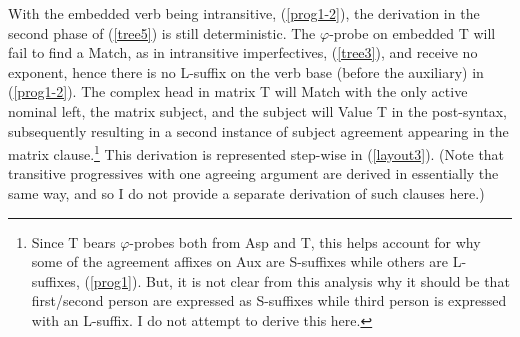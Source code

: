 \documentclass[output=paper
,modfonts
,nonflat]{langsci/langscibook}
\begin{document}
\begin{exe}
\ex\label{tree5}%
\end{exe}

With the embedded verb being intransitive, (\ref{prog1-2}), the derivation in the second phase of (\ref{tree5}) is still deterministic. The $\varphi$-probe on embedded T will fail to find a Match, as in intransitive imperfectives, (\ref{tree3}), and receive no exponent, hence there is no L-suffix on the verb base (before the auxiliary) in (\ref{prog1-2}). The complex head in matrix T will Match with the only active nominal left, the matrix subject, and the subject will Value T in the post-syntax, subsequently resulting in a second instance of subject agreement appearing in the matrix clause.\footnote{Since T bears $\varphi$-probes both from Asp and T, this helps account for why some of the agreement affixes on Aux are S-suffixes while others are L-suffixes, (\ref{prog1}). But, it is not clear from this analysis why it should be that first/second  person are expressed as S-suffixes while third person is expressed with an L-suffix. I do not attempt to derive this here.} This derivation is represented step-wise in (\ref{layout3}). (Note that transitive progressives with one agreeing argument are derived in essentially the same way, and so I do not provide a separate derivation of such clauses here.)\largerpage[-1]
\end{document}

